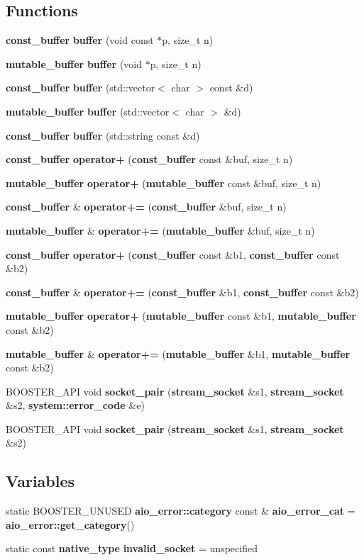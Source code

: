 \subsection*{Functions}
\begin{DoxyCompactItemize}
\item 
{\bf const\+\_\+buffer} {\bf buffer} (void const $\ast$p, size\+\_\+t n)
\item 
{\bf mutable\+\_\+buffer} {\bf buffer} (void $\ast$p, size\+\_\+t n)
\item 
{\bf const\+\_\+buffer} {\bf buffer} (std\+::vector$<$ char $>$ const \&d)
\item 
{\bf mutable\+\_\+buffer} {\bf buffer} (std\+::vector$<$ char $>$ \&d)
\item 
{\bf const\+\_\+buffer} {\bf buffer} (std\+::string const \&d)
\item 
{\bf const\+\_\+buffer} {\bf operator+} ({\bf const\+\_\+buffer} const \&buf, size\+\_\+t n)
\item 
{\bf mutable\+\_\+buffer} {\bf operator+} ({\bf mutable\+\_\+buffer} const \&buf, size\+\_\+t n)
\item 
{\bf const\+\_\+buffer} \& {\bf operator+=} ({\bf const\+\_\+buffer} \&buf, size\+\_\+t n)
\item 
{\bf mutable\+\_\+buffer} \& {\bf operator+=} ({\bf mutable\+\_\+buffer} \&buf, size\+\_\+t n)
\item 
{\bf const\+\_\+buffer} {\bf operator+} ({\bf const\+\_\+buffer} const \&b1, {\bf const\+\_\+buffer} const \&b2)
\item 
{\bf const\+\_\+buffer} \& {\bf operator+=} ({\bf const\+\_\+buffer} \&b1, {\bf const\+\_\+buffer} const \&b2)
\item 
{\bf mutable\+\_\+buffer} {\bf operator+} ({\bf mutable\+\_\+buffer} const \&b1, {\bf mutable\+\_\+buffer} const \&b2)
\item 
{\bf mutable\+\_\+buffer} \& {\bf operator+=} ({\bf mutable\+\_\+buffer} \&b1, {\bf mutable\+\_\+buffer} const \&b2)
\item 
B\+O\+O\+S\+T\+E\+R\+\_\+\+A\+PI void {\bf socket\+\_\+pair} ({\bf stream\+\_\+socket} \&s1, {\bf stream\+\_\+socket} \&s2, {\bf system\+::error\+\_\+code} \&e)
\item 
B\+O\+O\+S\+T\+E\+R\+\_\+\+A\+PI void {\bf socket\+\_\+pair} ({\bf stream\+\_\+socket} \&s1, {\bf stream\+\_\+socket} \&s2)
\end{DoxyCompactItemize}
\subsection*{Variables}
\begin{DoxyCompactItemize}
\item 
static B\+O\+O\+S\+T\+E\+R\+\_\+\+U\+N\+U\+S\+ED {\bf aio\+\_\+error\+::category} const \& {\bf aio\+\_\+error\+\_\+cat} = {\bf aio\+\_\+error\+::get\+\_\+category}()
\item 
static const {\bf native\+\_\+type} {\bf invalid\+\_\+socket} = unspecified
\end{DoxyCompactItemize}


